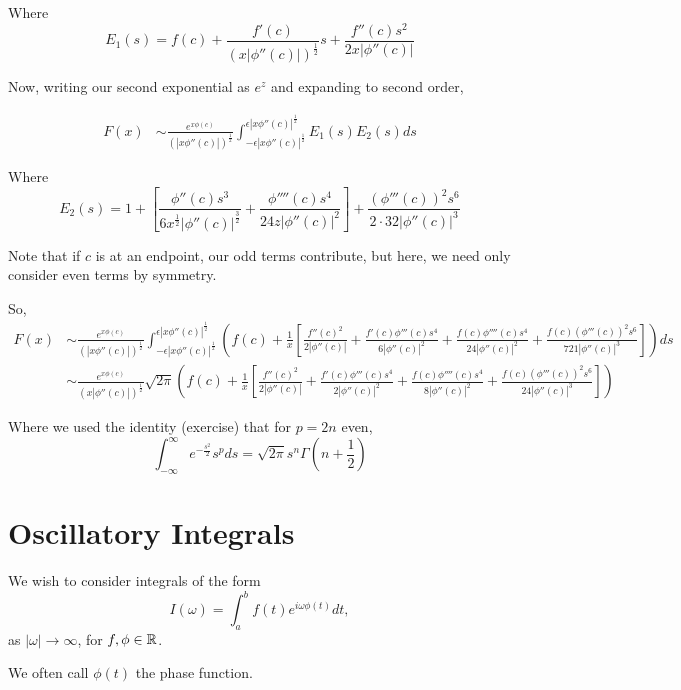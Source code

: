 \documentclass[a4paper]{article}
\begin{document}
Where \[
	E_1(s) = f(c) + \frac{f'(c)}{\left( x|\phi''(c)| \right)^{\frac{1}{2}} }s + \frac{f''(c) s^2}{2x|\phi''(c)|} 
\]

Now, writing our second exponential as $e^{z}$ and expanding to second order,

\begin{align*}
	F(x) &\sim \frac{e^{x\phi(c)}}{\left( |x\phi''(c)| \right)^{\frac{1}{2}} } \int_{-\epsilon|x\phi''(c)|^{\frac{1}{2}}}^{\epsilon |x\phi''(c)|^{\frac{1}{2}}} E_1(s) E_2(s) ds 
\end{align*}

Where \[
	E_2(s) = 1 + \left[ \frac{\phi''(c) s^3}{6x^{\frac{1}{2}} |\phi''(c)|^{\frac{3}{2}}} + \frac{\phi''''(c) s^{4}}{24 z|\phi''(c)|^2 } \right]  + \frac{(\phi'''(c))^2s^{6}}{2\cdot 32 |\phi''(c)|^3}
\]

Note that if $c$ is at an endpoint, our odd terms contribute, but here, we need only consider even terms by symmetry.

So,
\begin{align*}
	F(x) &\sim \frac{e^{x\phi(c)}}{\left( |x\phi''(c)| \right)^{\frac{1}{2}} } \int_{-\epsilon|x\phi''(c)|^{\frac{1}{2}}}^{\epsilon |x\phi''(c)|^{\frac{1}{2}}} \left( f(c) + \frac{1}{x} \left[ \frac{f''(c) ^2}{2 |\phi''(c)|} + \frac{f'(c) \phi'''(c) s^{4}}{6|\phi''(c)|^2} + \frac{f(c) \phi''''(c) s^{4}}{24|\phi''(c)|^2} + \frac{f(c)(\phi'''(c))^2 s^{6}}{721 |\phi''(c)|^3}\right]  \right) ds \\
	&\sim \frac{e^{x\phi(c)}}{\left( x|\phi''(c)| \right)^{\frac{1}{2}} } \sqrt{2\pi}  \left( f(c) + \frac{1}{x} \left[ \frac{f''(c) ^2}{2 |\phi''(c)|} + \frac{f'(c) \phi'''(c) s^{4}}{2|\phi''(c)|^2} + \frac{f(c) \phi''''(c) s^{4}}{8|\phi''(c)|^2} + \frac{f(c)(\phi'''(c))^2 s^{6}}{24 |\phi''(c)|^3}\right]  \right) 
\end{align*}

Where we used the identity (exercise) that for $p=2n$ even,
\[
	\int_{-\infty}^{\infty} e^{-\frac{s^2}{2}} s^{p} ds = \sqrt{2\pi} s^{n}\Gamma(n+\frac{1}{2}) 
\] 

\section{Oscillatory Integrals}

We wish to consider integrals of the form
\[
	I(\omega) = \int_{a}^{b} f(t) e^{i\omega \phi(t)} dt
,\] as $|\omega| \to  \infty$, for $f, \phi \in \mathbb{R}$.

We often call $\phi(t)$ the phase function.
\end{document}
